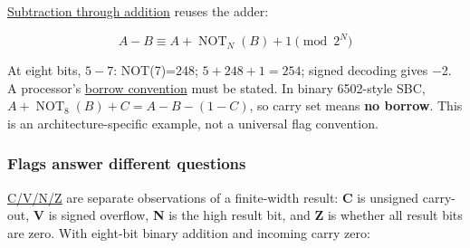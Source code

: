 \hyperref[appendix-1c7df340573e]{Subtraction through addition} reuses the adder:

\[
A-B \equiv A+\operatorname{NOT}_N(B)+1\pmod{2^N}
\]

At eight bits, \(5-7\): NOT(7)=248; \(5+248+1=254\); signed decoding gives −2. A processor's \hyperref[appendix-d52d5f78ffd1]{borrow convention} must be stated. In binary 6502-style SBC, \(A+\operatorname{NOT}_8(B)+C=A-B-(1-C)\), so carry set means \textbf{no borrow}. This is an architecture-specific example, not a universal flag convention.

\subsubsection{Flags answer different questions}\label{01-foundations-i-ch001-flags-answer-different-questions}

\hypertarget{01-foundations-i-ch001-flags-answer-different-questions}{}

\hyperref[appendix-8d687c9c08ab]{C/V/N/Z} are separate observations of a finite-width result: \textbf{C} is unsigned carry-out, \textbf{V} is signed overflow, \textbf{N} is the high result bit, and \textbf{Z} is whether all result bits are zero. With eight-bit binary addition and incoming carry zero:


